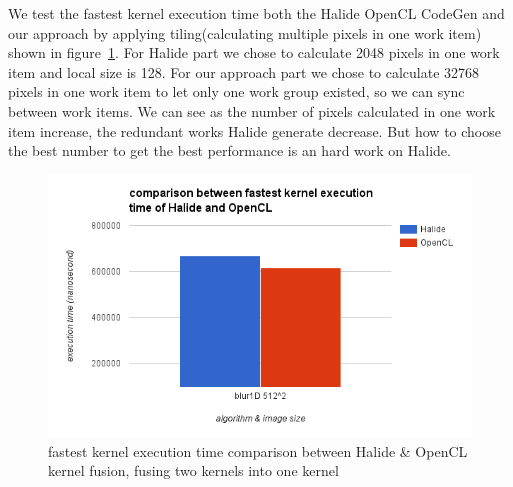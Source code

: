     We test the fastest kernel execution time both the Halide OpenCL CodeGen and our approach by applying tiling(calculating multiple pixels in one work item) shown in figure~\ref{fig:my_label_ex_7}. For Halide part we chose to calculate 2048 pixels in one work item and local size is 128. For our approach part we chose to calculate 32768 pixels in one work item to let only one work group existed, so we can sync between work items. We can see as the number of pixels calculated in one work item increase, the redundant works Halide generate decrease. But how to choose the best number to get the best performance is an hard work on Halide.

\begin{figure}[hbtp]
\centering
\includegraphics[width=14cm]{img/fastest.png}
\caption{fastest kernel execution time comparison between Halide \& OpenCL kernel fusion, fusing two kernels into one kernel}
\label{fig:my_label_ex_7}
\end{figure}
